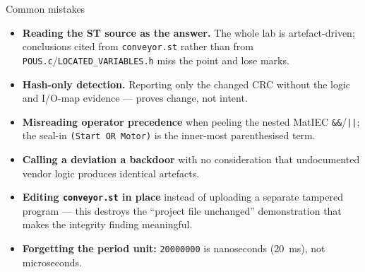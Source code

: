 \documentclass[11pt,a4paper]{article}
\begin{document}
\begin{solutionbox}{Common mistakes}
\begin{itemize}\setlength{\itemsep}{1pt}
  \item \textbf{Reading the ST source as the answer.} The whole lab is
        artefact-driven; conclusions cited from \texttt{conveyor.st} rather
        than from \texttt{POUS.c}/\texttt{LOCATED\_VARIABLES.h} miss the
        point and lose marks.
  \item \textbf{Hash-only detection.} Reporting only the changed CRC without
        the logic and I/O-map evidence --- proves change, not intent.
  \item \textbf{Misreading operator precedence} when peeling the nested
        MatIEC \texttt{\&\&}/\texttt{||}; the seal-in \texttt{(Start OR
        Motor)} is the inner-most parenthesised term.
  \item \textbf{Calling a deviation a backdoor} with no consideration that
        undocumented vendor logic produces identical artefacts.
  \item \textbf{Editing \texttt{conveyor.st} in place} instead of uploading
        a separate tampered program --- this destroys the ``project file
        unchanged'' demonstration that makes the integrity finding
        meaningful.
  \item \textbf{Forgetting the period unit:} \texttt{20000000} is
        nanoseconds (20~ms), not microseconds.
\end{itemize}
\end{solutionbox}
\end{document}
